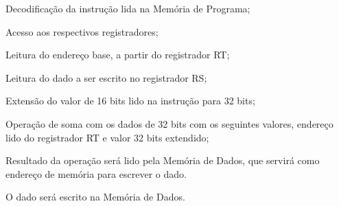 \documentclass{article}
\begin{document}
  
  \begin{mainflow}
    \item Decodificação da instrução lida na Memória de Programa;
	\item Acesso aos respectivos registradores;
	\item Leitura do endereço base, a partir do registrador RT;
	\item Leitura do dado a ser escrito no registrador RS;
	\item Extensão do valor de 16 bits lido na instrução para 32 bits;
	\item Operação de soma com os dados de 32 bits com os seguintes valores, endereço lido do registrador RT e valor 32 bits extendido;
	\item Resultado da operação será lido pela Memória de Dados, que servirá como endereço de memória para escrever o dado.
	\item O dado será escrito na Memória de Dados.


  \end{mainflow}
  

% 
% 
\end{document}
